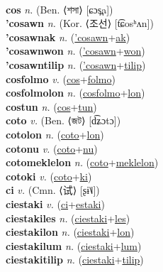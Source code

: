  \label{cocak} \\
\textbf{cos} \textit{n.} (Ben. ⟨শসা⟩ [ɕɔs̪a])
 \label{cos} \\
\textbf{'cosawn} \textit{n.} (Kor. ⟨조선⟩ [t͡ɕosʰʌn])
 \label{'cosawn} \\
\textbf{'cosawnak} \textit{n.} (\hyperref['cosawn]{'cosawn}+\hyperref[ak]{ak})
 \label{'cosawnak} \\
\textbf{'cosawnwon} \textit{n.} (\hyperref['cosawn]{'cosawn}+\hyperref[won]{won})
 \label{'cosawnwon} \\
\textbf{'cosawntilip} \textit{n.} (\hyperref['cosawn]{'cosawn}+\hyperref[tilip]{tilip})
 \label{'cosawntilip} \\
\textbf{cosfolmo} \textit{v.} (\hyperref[cos]{cos}+\hyperref[folmo]{folmo})
 \label{cosfolmo} \\
\textbf{cosfolmolon} \textit{n.} (\hyperref[cosfolmo]{cosfolmo}+\hyperref[lon]{lon})
 \label{cosfolmolon} \\
\textbf{costun} \textit{n.} (\hyperref[cos]{cos}+\hyperref[tun]{tun})
 \label{costun} \\
\textbf{coto} \textit{v.} (Ben. ⟨জট⟩ [d͡ʑɔtɔ])
 \label{coto} \\
\textbf{cotolon} \textit{n.} (\hyperref[coto]{coto}+\hyperref[lon]{lon})
 \label{cotolon} \\
\textbf{cotonu} \textit{v.} (\hyperref[coto]{coto}+\hyperref[nu]{nu})
 \label{cotonu} \\
\textbf{cotomeklelon} \textit{n.} (\hyperref[coto]{coto}+\hyperref[meklelon]{meklelon})
 \label{cotomeklelon} \\
\textbf{cotoki} \textit{v.} (\hyperref[coto]{coto}+\hyperref[ki]{ki})
 \label{cotoki} \\
\textbf{ci} \textit{v.} (Cmn. ⟨试⟩ [ʂɨ˥˩])
 \label{ci} \\
\textbf{ciestaki} \textit{v.} (\hyperref[ci]{ci}+\hyperref[estaki]{estaki})
 \label{ciestaki} \\
\textbf{ciestakiles} \textit{n.} (\hyperref[ciestaki]{ciestaki}+\hyperref[les]{les})
 \label{ciestakiles} \\
\textbf{ciestakilon} \textit{n.} (\hyperref[ciestaki]{ciestaki}+\hyperref[lon]{lon})
 \label{ciestakilon} \\
\textbf{ciestakilum} \textit{n.} (\hyperref[ciestaki]{ciestaki}+\hyperref[lum]{lum})
 \label{ciestakilum} \\
\textbf{ciestakitilip} \textit{n.} (\hyperref[ciestaki]{ciestaki}+\hyperref[tilip]{tilip})
 \label{ciestakitilip} \\
